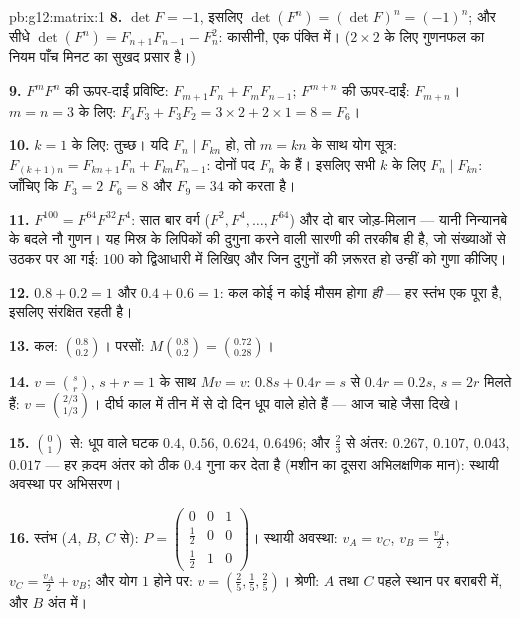\begin{solution}{pb:g12:matrix:1}
\textbf{8.} $\det F = -1$, इसलिए $\det(F^n) = (\det F)^n = (-1)^n$; और सीधे $\det(F^n) = F_{n+1}F_{n-1} - F_n^2$: कासीनी, एक पंक्ति में। ($2 \times 2$
 के लिए गुणनफल का नियम पाँच मिनट का सुखद प्रसार है।)

\textbf{9.} $F^m F^n$ की ऊपर-दाईं प्रविष्टि: $F_{m+1}F_n + F_m F_{n-1}$; $F^{m+n}$ की ऊपर-दाईं: $F_{m+n}$।
$m = n = 3$ के लिए: $F_4 F_3 + F_3 F_2 = 3 \times 2 + 2 \times 1 = 8 = F_6$।

\textbf{10.} $k = 1$ के लिए: तुच्छ। यदि $F_n \mid F_{kn}$ हो, तो $m = kn$ के साथ योग सूत्र:
$F_{(k+1)n} = F_{kn+1}F_n + F_{kn}F_{n-1}$: दोनों पद $F_n$ के  हैं। इसलिए सभी $k$ के लिए $F_n \mid F_{kn}$: जाँचिए कि
$F_3 = 2$ $F_6 = 8$ और $F_9 = 34$ को  करता है।

\textbf{11.} $F^{100} = F^{64} F^{32} F^4$: सात बार वर्ग ($F^2, F^4, \dots, F^{64}$) और दो बार जोड़-मिलान --- यानी
निन्यानबे के बदले नौ गुणन। यह मिस्र के लिपिकों की दुगुना करने वाली सारणी की
तरकीब ही है, जो संख्याओं से उठकर  पर आ गई: $100$ को द्विआधारी में
लिखिए और जिन दुगुनों की ज़रूरत हो उन्हीं को गुणा कीजिए।

\textbf{12.} $0.8 + 0.2 = 1$ और $0.4 + 0.6 = 1$: कल कोई न कोई मौसम होगा \emph{ही} --- हर स्तंभ
एक पूरा   है, इसलिए  संरक्षित रहती है।

\textbf{13.} कल: $\binom{0.8}{0.2}$। परसों: $M\binom{0.8}{0.2} = \binom{0.72}{0.28}$।

\textbf{14.} $v = \binom{s}{r}$, $s + r = 1$ के साथ $Mv = v$: $0.8s + 0.4r = s$ से $0.4r = 0.2s$, $s = 2r$ मिलते हैं:
$v = \binom{2/3}{1/3}$। दीर्घ काल में तीन में से दो दिन धूप वाले होते हैं --- आज चाहे जैसा
दिखे।

\textbf{15.} $\binom01$ से: धूप वाले घटक $0.4$, $0.56$, $0.624$, $0.6496$; और $\frac23$ से
अंतर: $0.267$, $0.107$, $0.043$, $0.017$ --- हर क़दम अंतर को ठीक $0.4$ गुना कर देता
है (मशीन का दूसरा अभिलक्षणिक मान): स्थायी अवस्था पर  अभिसरण।

\textbf{16.} स्तंभ ($A$, $B$, $C$ से): $P = \begin{pmatrix} 0 & 0 & 1\\ \frac12 & 0 & 0\\
\frac12 & 1 & 0\end{pmatrix}$। स्थायी अवस्था: $v_A = v_C$,
$v_B = \frac{v_A}{2}$, $v_C = \frac{v_A}{2} + v_B$; और योग $1$ होने पर: $v = \left(\frac25, \frac15, \frac25\right)$। श्रेणी: $A$ तथा $C$ पहले
स्थान पर बराबरी में, और $B$ अंत में।


\end{solution}
